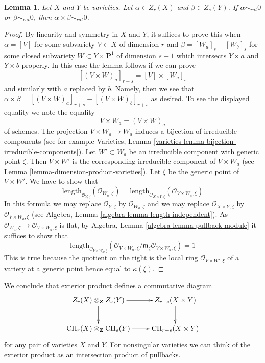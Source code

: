 \documentclass{stacks-project}
\theoremstyle{plain}
\newtheorem{lemma}[subsection]{Lemma}
\theoremstyle{definition}
\theoremstyle{remark}
\numberwithin{equation}{subsection}
\def\CH{\mathop{\mathrm{CH}}\nolimits}
\begin{document}
\begin{lemma}
\label{lemma-exterior-product-rational-equivalence}
Let $X$ and $Y$ be varieties.
Let $\alpha \in Z_r(X)$ and $\beta \in Z_s(Y)$.
If $\alpha \sim_{rat} 0$ or $\beta \sim_{rat} 0$, then
$\alpha \times \beta \sim_{rat} 0$.
\end{lemma}

\begin{proof}
By linearity and symmetry in $X$ and $Y$, it suffices to prove this when
$\alpha = [V]$ for some subvariety $V \subset X$ of dimension $r$ and
$\beta = [W_a]_s - [W_b]_s$ for some closed subvariety
$W \subset Y \times \mathbf{P}^1$ of dimension $s + 1$ which
intersects $Y \times a$ and $Y \times b$ properly. In this case
the lemma follows if we can prove
$$
[(V \times W)_a]_{r + s} = [V] \times [W_a]_s
$$
and similarly with $a$ replaced by $b$. Namely, then we see that
$\alpha \times \beta = [(V \times W)_a]_{r + s} - [(V \times W)_b]_{r + s}$
as desired. To see the displayed equality we note the equality
$$
V \times W_a = (V \times W)_a
$$
of schemes. The projection $V \times W_a \to W_a$ induces a bijection
of irreducible components (see for example
Varieties, Lemma \ref{varieties-lemma-bijection-irreducible-components}).
Let $W' \subset W_a$ be an irreducible component with generic point $\zeta$.
Then $V \times W'$ is the corresponding irreducible component of
$V \times W_a$ (see Lemma \ref{lemma-dimension-product-varieties}).
Let $\xi$ be the generic point of $V \times W'$. We have to show that
$$
\text{length}_{\mathcal{O}_{Y, \zeta}}(\mathcal{O}_{W_a, \zeta}) =
\text{length}_{\mathcal{O}_{X \times Y, \xi}}(
\mathcal{O}_{V \times W_a, \xi})
$$
In this formula we may replace
$\mathcal{O}_{Y, \zeta}$ by $\mathcal{O}_{W_a, \zeta}$ and
we may replace
$\mathcal{O}_{X \times Y, \zeta}$ by $\mathcal{O}_{V \times W_a, \zeta}$
(see Algebra, Lemma \ref{algebra-lemma-length-independent}).
As $\mathcal{O}_{W_a, \zeta} \to \mathcal{O}_{V \times W_a, \xi}$ is flat,
by Algebra, Lemma \ref{algebra-lemma-pullback-module} it suffices
to show that
$$
\text{length}_{\mathcal{O}_{V \times W_a, \xi}}(
\mathcal{O}_{V \times W_a, \xi}/
\mathfrak m_\zeta\mathcal{O}_{V \times W_a, \xi}) = 1
$$
This is true because the quotient on the right is the local ring
$\mathcal{O}_{V \times W', \xi}$ of a variety at a generic point
hence equal to $\kappa(\xi)$.
\end{proof}

\noindent
We conclude that exterior product defines a commutative diagram
$$
\xymatrix{
Z_r(X) \otimes_\mathbf{Z} Z_s(Y) \ar[r] \ar[d] &
Z_{r + s}(X \times Y) \ar[d] \\
\CH_r(X) \otimes_\mathbf{Z} \CH_s(Y) \ar[r] &
\CH_{r + s}(X \times Y)
}
$$
for any pair of varieties $X$ and $Y$. For nonsingular varieties
we can think of the exterior product as an intersection product
of pullbacks.
\end{document}

